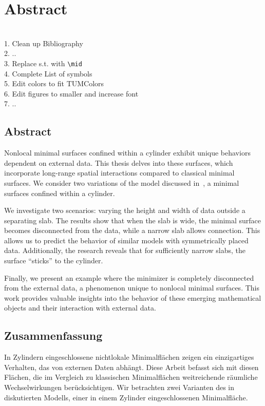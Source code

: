 \chapter{Abstract}
\label{ch:abstract}

\begin{TODO}~\\
	1. Clean up Bibliography\\
	2. .. \\
	3. Replace s.t. with \verb=\mid= \\
	4. Complete List of symbols\\
	5. Edit colors to fit TUMColors\\
	6. Edit figures to smaller and increase font\\
	7. ..
\end{TODO}

\section*{Abstract}
Nonlocal minimal surfaces confined within a cylinder exhibit unique behaviors dependent on
external data. This thesis delves into these surfaces, which incorporate long-range
spatial interactions compared to classical minimal surfaces. We consider two variations of
the model discussed in~\cite{dipierro2020disconnectedness}, a minimal surfaces confined
within a cylinder.\newline

We investigate two scenarios: varying the height and width of data outside a separating
slab. The results show that when the slab is wide, the minimal surface becomes
disconnected from the data, while a narrow slab allows connection. This allows us to
predict the behavior of similar models with symmetrically placed data. Additionally, the
research reveals that for sufficiently narrow slabs, the surface \enquote{sticks} to the
cylinder.\newline

Finally, we present an example where the minimizer is completely disconnected from the
external data, a phenomenon unique to nonlocal minimal surfaces. This work provides
valuable insights into the behavior of these emerging mathematical objects and their
interaction with external data.


\section*{Zusammenfassung}
In Zylindern eingeschlossene nichtlokale Minimalflächen zeigen ein einzigartiges
Verhalten, das von externen Daten abhängt. Diese Arbeit befasst sich mit diesen Flächen,
die im Vergleich zu klassischen Minimalflächen weitreichende räumliche Wechselwirkungen
berücksichtigen. Wir betrachten zwei Varianten des in~\cite{dipierro2020disconnectedness}
diskutierten Modells, einer in einem Zylinder eingeschlossenen Minimalfläche.\newline

